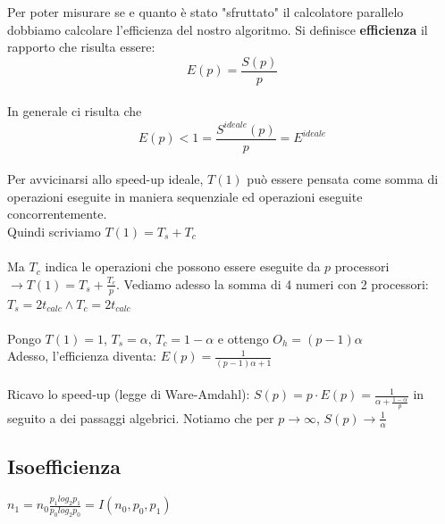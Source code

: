 \documentclass{article}
\begin{document}
Per poter misurare se e quanto è stato "sfruttato" il calcolatore parallelo dobbiamo calcolare l'efficienza del nostro algoritmo.
Si definisce \textbf{efficienza} il rapporto che risulta essere: $$ E(p) = \frac{S(p)}{p} $$\\
In generale ci risulta che $$ E(p) < 1 = \frac{S^{ideale}(p)}{p} = E^{ideale} $$\\
Per avvicinarsi allo speed-up ideale, $T(1)$ può essere pensata come somma di operazioni eseguite in maniera sequenziale ed operazioni eseguite concorrentemente.\\
Quindi scriviamo $T(1)=T_s + T_c$
\\
\\
Ma $T_c$ indica le operazioni che possono essere eseguite da $p$ processori $\rightarrow T(1)= T_s + \frac{T_c}{p}$.
Vediamo adesso la somma di 4 numeri con 2 processori:\\
$T_s = 2t_{calc} \wedge T_c = 2t_{calc}$
\\
\\
Pongo $T(1)=1$, $T_s=\alpha$, $T_c = 1-\alpha$ e ottengo $O_h = (p-1)\alpha$\\
Adesso, l'efficienza diventa:
$E(p)=\frac{1}{(p-1)\alpha + 1}$
\\
\\
Ricavo lo speed-up (legge di Ware-Amdahl):
$S(p)=p\cdot E(p)=\frac{1}{\alpha + \frac{1-\alpha}{p}}$ in seguito a dei passaggi algebrici.
Notiamo che per $p\rightarrow \infty$, $S(p)\rightarrow \frac{1}{\alpha}$

\subsection{Isoefficienza}


$n_1 = n_0\frac{p_{1} log_{2} p_{1}}{p_{0} log_{2} p_{0}} = I(n_{0}, p_{0}, p_{1})$
\end{document}
